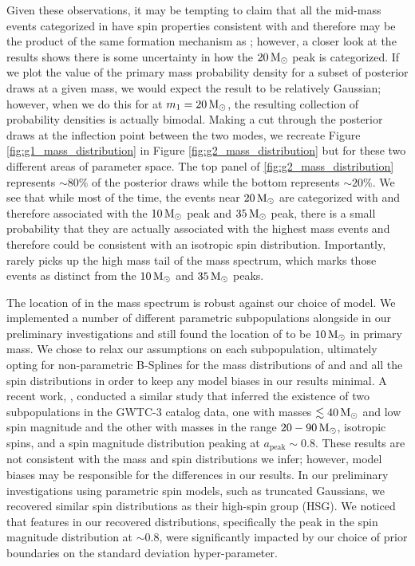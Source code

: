 Given these observations, it may be tempting to claim that all the mid-mass events categorized in \contA{} have spin properties consistent with \first{} and therefore may be the product of the same formation mechanism as \first{}; however, a closer look at the results shows there is some uncertainty in how the $20 {\,\rm M}_\odot$ peak is categorized. If we plot the value of the primary mass probability density for a subset of posterior draws at a given mass, we would expect the result to be relatively Gaussian; however, when we do this for \contB{} at $m_1 = 20 {\,\rm M}_\odot$, the resulting collection of probability densities is actually bimodal. Making a cut through the posterior draws at the inflection point between the two modes, we recreate Figure \ref{fig:g1_mass_distribution} in Figure \ref{fig:g2_mass_distribution} but for these two different areas of parameter space. The top panel of \ref{fig:g2_mass_distribution} represents $\sim80\%$ of the posterior draws while the bottom represents $\sim20\%$. We see that while most of the time, the events near $20{\,\rm M}_\odot$ are categorized with \contA{} and therefore associated with the $10{\,\rm M}_\odot$ peak and $35{\,\rm M}_\odot$ peak, there is a small probability that they are actually associated with the highest mass events and therefore could be consistent with an isotropic spin distribution. Importantly, \contA{} rarely picks up the high mass tail of the mass spectrum, which marks those events as distinct from the $10{\,\rm M}_\odot$ and $35{\,\rm M}_\odot$ peaks. 

The location of \first{} in the mass spectrum is robust against our choice of model. We implemented a number of different parametric subpopulations alongside \first{} in our preliminary investigations and still found the location of \first{} to be $10{\,\rm M}_\odot$ in primary mass. We chose to relax our assumptions on each subpopulation, ultimately opting for non-parametric B-Splines for the mass distributions of \contA{} and \contB{} and all the spin distributions in order to keep any model biases in our results minimal. A recent work, \citet{2303.02973}, conducted a similar study that inferred the existence of two subpopulations in the GWTC-3 catalog data, one with masses $\lesssim 40{\,\rm M}_\odot$ and low spin magnitude and the other with masses in the range $20-90{\,\rm M}_\odot$, isotropic spins, and a spin magnitude distribution peaking at $a_\text{peak} \sim 0.8$. These results are not consistent with the mass and spin distributions we infer; however, model biases may be responsible for the differences in our results. In our preliminary investigations using parametric spin models, such as truncated Gaussians, we recovered similar spin distributions as their high-spin group (HSG). We noticed that features in our recovered distributions, specifically the peak in the spin magnitude distribution at $\sim 0.8$, were significantly impacted by our choice of prior boundaries on the standard deviation hyper-parameter.


